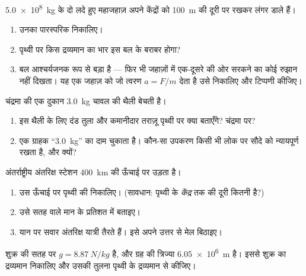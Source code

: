 \begin{exercise}[$\star\star$]\label{exo:g10:universal-gravitation:6}
\qty{5.0e8}{kg} के दो लदे हुए महाजहाज़ अपने केंद्रों को \qty{100}{m} की दूरी पर रखकर
लंगर डाले हैं।
\begin{enumerate}
  \item उनका पारस्परिक  निकालिए।
  \item पृथ्वी पर किस द्रव्यमान का भार इस बल के बराबर होगा?
  \item बल आश्चर्यजनक रूप से बड़ा है --- फिर भी जहाज़ों में एक-दूसरे की
        ओर सरकने का कोई रुझान नहीं दिखता। यह एक जहाज़ को जो त्वरण
        $a = F/m$ देता है उसे निकालिए और टिप्पणी कीजिए।
\end{enumerate}
\end{exercise}

\begin{exercise}[$\star\star$]\label{exo:g10:universal-gravitation:7}
चंद्रमा की एक दुकान \qty{3.0}{kg} चावल की थैली बेचती है।
\begin{enumerate}
  \item इस थैली के लिए दंड तुला और कमानीदार तराज़ू पृथ्वी पर क्या
        बताएँगे? चंद्रमा पर?
  \item एक ग्राहक ``\qty{3.0}{kg}'' का दाम चुकाता है। कौन-सा उपकरण किसी भी
        लोक पर सौदे को न्यायपूर्ण रखता है, और क्यों?
\end{enumerate}
\end{exercise}

\begin{exercise}[$\star\star$]\label{exo:g10:universal-gravitation:8}
अंतर्राष्ट्रीय अंतरिक्ष स्टेशन \qty{400}{km} की ऊँचाई पर उड़ता है।
\begin{enumerate}
  \item उस ऊँचाई पर पृथ्वी की 
        निकालिए। (सावधान: पृथ्वी के \emph{केंद्र} तक की दूरी कितनी है?)
  \item उसे सतह वाले मान के प्रतिशत में बताइए।
  \item यान पर सवार अंतरिक्ष यात्री तैरते हैं। इसे अपने उत्तर से मेल
        बिठाइए।
\end{enumerate}
\end{exercise}

\begin{exercise}[$\star\star$]\label{exo:g10:universal-gravitation:9}
शुक्र की सतह पर $g = \qty{8.87}{N/kg}$ है, और ग्रह की त्रिज्या \qty{6.05e6}{m} है। इससे शुक्र
का द्रव्यमान निकालिए और उसकी तुलना पृथ्वी के द्रव्यमान से कीजिए।
\end{exercise}

